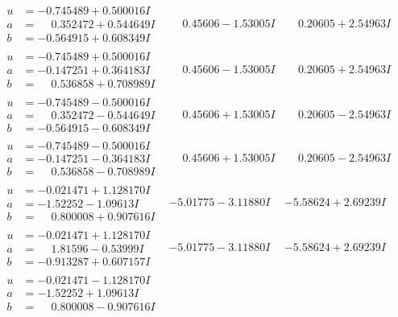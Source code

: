 \documentclass[1p]{elsarticle_modified}
\theoremstyle{definition}
\begin{document}
$$\begin{array}{c|c|c}
\begin{aligned}
u &= -0.745489 + 0.500016 I \\
a &= \phantom{-}0.352472 + 0.544649 I \\
b &= -0.564915 + 0.608349 I\end{aligned}
 & \phantom{-}0.45606 - 1.53005 I & \phantom{-}0.20605 + 2.54963 I \\ \hline\begin{aligned}
u &= -0.745489 + 0.500016 I \\
a &= -0.147251 + 0.364183 I \\
b &= \phantom{-}0.536858 + 0.708989 I\end{aligned}
 & \phantom{-}0.45606 - 1.53005 I & \phantom{-}0.20605 + 2.54963 I \\ \hline\begin{aligned}
u &= -0.745489 - 0.500016 I \\
a &= \phantom{-}0.352472 - 0.544649 I \\
b &= -0.564915 - 0.608349 I\end{aligned}
 & \phantom{-}0.45606 + 1.53005 I & \phantom{-}0.20605 - 2.54963 I \\ \hline\begin{aligned}
u &= -0.745489 - 0.500016 I \\
a &= -0.147251 - 0.364183 I \\
b &= \phantom{-}0.536858 - 0.708989 I\end{aligned}
 & \phantom{-}0.45606 + 1.53005 I & \phantom{-}0.20605 - 2.54963 I \\ \hline\begin{aligned}
u &= -0.021471 + 1.128170 I \\
a &= -1.52252 - 1.09613 I \\
b &= \phantom{-}0.800008 + 0.907616 I\end{aligned}
 & -5.01775 - 3.11880 I & -5.58624 + 2.69239 I \\ \hline\begin{aligned}
u &= -0.021471 + 1.128170 I \\
a &= \phantom{-}1.81596 - 0.53999 I \\
b &= -0.913287 + 0.607157 I\end{aligned}
 & -5.01775 - 3.11880 I & -5.58624 + 2.69239 I \\ \hline\begin{aligned}
u &= -0.021471 - 1.128170 I \\
a &= -1.52252 + 1.09613 I \\
b &= \phantom{-}0.800008 - 0.907616 I\end{aligned}

\end{array}$$
\end{document}

